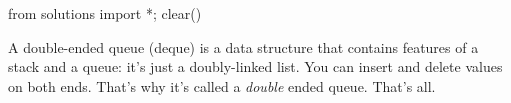 \begin{python0}
from solutions import *; clear()
\end{python0}

A double-ended queue (deque) is a data structure that contains features of
a stack and a queue:
it's just a doubly-linked list.
You can insert and delete values on both ends.
That's why it's called a \textit{double} ended queue.
That's all.

